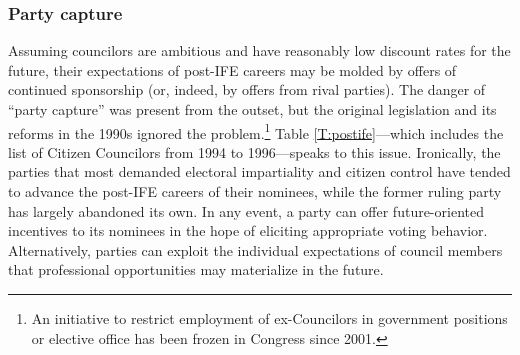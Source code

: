 \documentclass[12 pt, letter]{article}
\begin{document}
\subsubsection{Party capture}
Assuming councilors are ambitious and have reasonably low discount rates for the future, their expectations of post-IFE careers may be molded by offers of continued sponsorship (or, indeed, by offers from rival parties).  The danger of ``party capture'' was present from the outset, but the original legislation and its reforms in the 1990s ignored the problem.\footnote{An initiative to restrict employment of ex-Councilors in government positions or elective office has been frozen in Congress since 2001.}  Table \ref{T:postife}---which includes the list of Citizen Councilors from 1994 to 1996---speaks to this issue.  Ironically, the parties that most demanded electoral impartiality and citizen control have tended to advance the post-IFE careers of their nominees, while the former ruling party has largely abandoned its own.  In any event, a party can offer future-oriented incentives to its nominees in the hope of eliciting appropriate voting behavior.  Alternatively, parties can exploit the individual expectations of council members that professional opportunities may materialize in the future.
\end{document}
